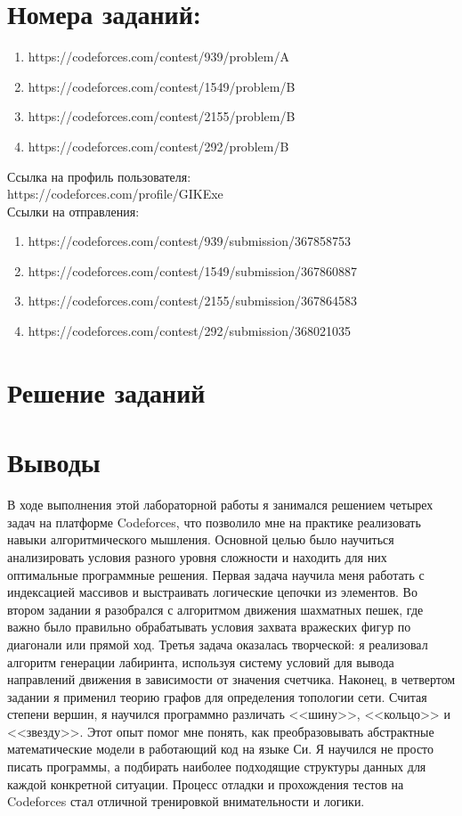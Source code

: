 \documentclass[oneside,a4paper,14pt]{extarticle} %
\begin{document}
	\section*{Номера заданий:}
	\begin{enumerate}
		\item https://codeforces.com/contest/939/problem/A
		\item https://codeforces.com/contest/1549/problem/B
		\item https://codeforces.com/contest/2155/problem/B
		\item https://codeforces.com/contest/292/problem/B
	\end{enumerate}
	\noindent Ссылка на профиль пользователя:\\
	\indent https://codeforces.com/profile/GIKExe \\
	\noindent Ссылки на отправления:
	\begin{enumerate}
		\item https://codeforces.com/contest/939/submission/367858753
		\item https://codeforces.com/contest/1549/submission/367860887
		\item https://codeforces.com/contest/2155/submission/367864583
		\item https://codeforces.com/contest/292/submission/368021035
	\end{enumerate}
	\newpage
	\section*{Решение заданий}
	
	\section*{Выводы} 
В ходе выполнения этой лабораторной работы я занимался решением четырех задач на
платформе Codeforces, что позволило мне на практике реализовать навыки алгоритмического
мышления. Основной целью было научиться анализировать условия разного уровня сложности
и находить для них оптимальные программные решения. Первая задача научила меня работать
с индексацией массивов и выстраивать логические цепочки из элементов. Во втором
задании я разобрался с алгоритмом движения шахматных пешек, где важно было правильно
обрабатывать условия захвата вражеских фигур по диагонали или прямой ход. Третья
задача оказалась творческой: я реализовал алгоритм генерации лабиринта, используя
систему условий для вывода направлений движения в зависимости от значения счетчика.
Наконец, в четвертом задании я применил теорию графов для определения топологии сети.
Считая степени вершин, я научился программно различать <<шину>>, <<кольцо>> и <<звезду>>. Этот
опыт помог мне понять, как преобразовывать абстрактные математические модели в
работающий код на языке Си. Я научился не просто писать программы, а подбирать наиболее
подходящие структуры данных для каждой конкретной ситуации. Процесс отладки и прохождения
тестов на Codeforces стал отличной тренировкой внимательности и логики.
	
\end{document}
